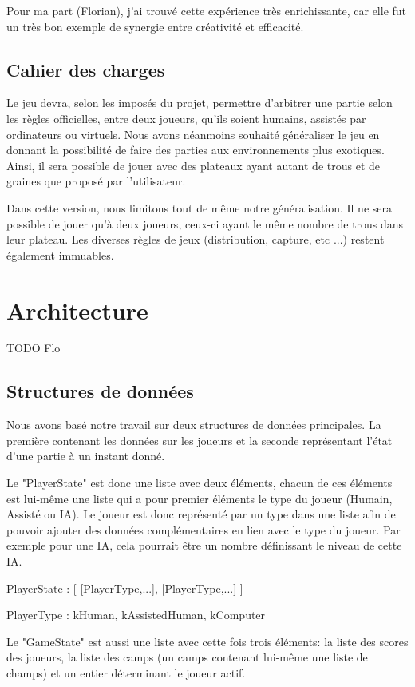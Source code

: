 \documentclass[]{article}
\begin{document}
Pour ma part (Florian), j'ai trouvé cette expérience très enrichissante, car elle fut un très bon exemple de synergie entre créativité et efficacité.

\subsection{Cahier des charges}

Le jeu devra, selon les imposés du projet, permettre d'arbitrer une partie selon les règles officielles, entre deux joueurs, qu'ils soient humains, assistés par ordinateurs ou virtuels. Nous avons néanmoins souhaité généraliser le jeu en donnant la possibilité de faire des parties aux environnements plus exotiques. Ainsi, il sera possible de jouer avec des plateaux ayant autant de trous et de graines que proposé par l'utilisateur. 

Dans cette version, nous limitons tout de même notre généralisation. Il ne sera possible de jouer qu'à deux joueurs, ceux-ci ayant le même nombre de trous dans leur plateau. Les diverses règles de jeux (distribution, capture, etc ...) restent également immuables.

\section{Architecture}

TODO Flo
\subsection{Structures de données}

	Nous avons basé notre travail sur deux structures de données principales. La première contenant les données sur les joueurs et la seconde représentant l'état d'une partie à un instant donné.

Le "PlayerState" est donc une liste avec deux éléments, chacun de ces éléments est lui-même une liste qui a pour premier éléments le type du joueur (Humain, Assisté ou IA).
Le joueur est donc représenté par un type dans une liste afin de pouvoir ajouter des données complémentaires en lien avec le type du joueur. Par exemple pour une IA, cela pourrait être un nombre définissant le niveau de cette IA.


PlayerState : 
[
	[PlayerType,...],
	[PlayerType,...]
]

PlayerType :
kHuman, kAssistedHuman, kComputer

Le "GameState" est aussi une liste avec cette fois trois éléments: la liste des scores des joueurs, la liste des camps (un camps contenant lui-même une liste de champs) et un entier déterminant le joueur actif.
\end{document}
